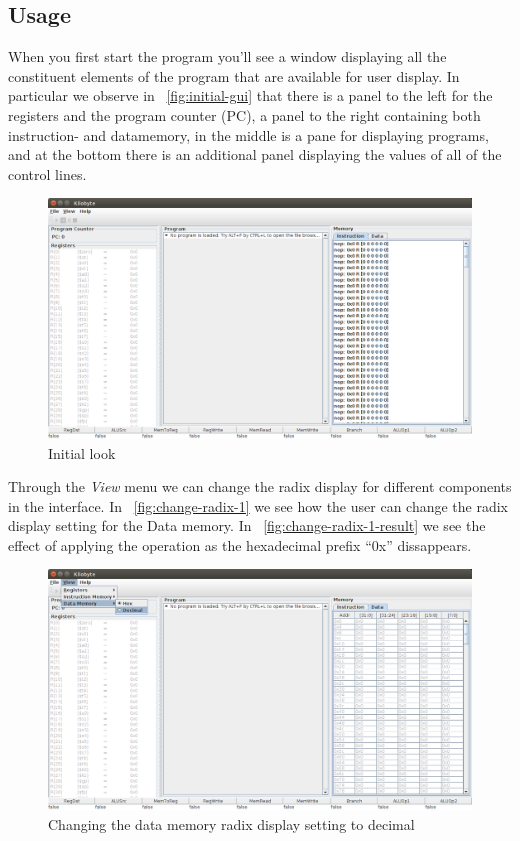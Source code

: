 \subsection{Usage}

When you first start the program you'll see a window displaying all
the constituent elements of the program that are available for user
display. In particular we observe in ~\autoref{fig:initial-gui} that
there is a panel to the left for the registers and the program counter
(PC), a panel to the right containing both instruction- and
datamemory, in the middle is a pane for displaying programs, and at
the bottom there is an additional panel displaying the values of all
of the control lines.

\begin{figure}[H]
  \centering
  \includegraphics[width=\textwidth]{images/initial_gui.png} 
  \caption{Initial look} 
  \label{fig:initial-gui}
\end{figure}

Through the \emph{View} menu we can change the radix display for
different components in the interface. In
~\autoref{fig:change-radix-1} we see how the user can change the radix
display setting for the Data memory. In
~\autoref{fig:change-radix-1-result} we see the effect of applying the
operation as the hexadecimal prefix ``0x'' dissappears.

\begin{figure}[H]
  \centering
  \includegraphics[width=\textwidth]{images/changing_data_memory_radix_to_dec.png} 
  \caption{Changing the data memory radix display setting to decimal} 
  \label{fig:change-radix-1}
\end{figure}

